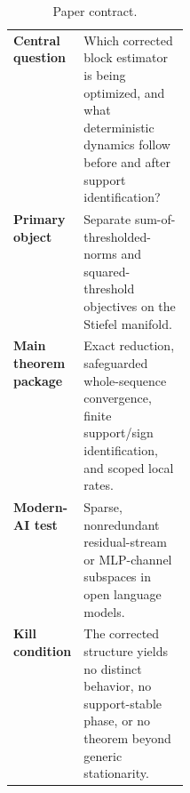 \begin{table}[t]
\centering
\caption{Paper contract.}
\label{tab:paper-contract}
\small
\begin{tabularx}{0.97\linewidth}{@{}>{\bfseries}p{0.23\linewidth}X@{}}
\toprule
Central question & Which corrected block estimator is being optimized, and what deterministic dynamics follow before and after support identification? \\
Primary object & Separate sum-of-thresholded-norms and squared-threshold objectives on the Stiefel manifold. \\
Main theorem package & Exact reduction, safeguarded whole-sequence convergence, finite support/sign identification, and scoped local rates. \\
Modern-AI test & Sparse, nonredundant residual-stream or MLP-channel subspaces in open language models. \\
Kill condition & The corrected structure yields no distinct behavior, no support-stable phase, or no theorem beyond generic stationarity. \\
\bottomrule
\end{tabularx}
\end{table}

